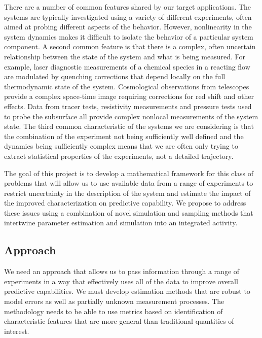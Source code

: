 \documentclass[11pt]{article}
\begin{document}
There are a number of common features shared by our target applications.
The systems are typically investigated using a variety of different experiments, often
aimed at probing different aspects of the behavior.
However, nonlinearity in the system dynamics makes it difficult to isolate the behavior of
a particular system component.
A second common feature is that there is a complex, often uncertain relationship between the state of the system and
what is being measured. For example, laser diagnostic measurements
of a chemical species in a reacting flow are modulated by quenching corrections that depend locally on the full
thermodynamic state of the system. Cosmological observations from telescopes provide a complex
space-time image  requiring corrections for
red shift and other effects. Data from tracer tests, resistivity measurements and pressure tests used to probe the subsurface
all provide complex nonlocal measurements of the system state. 
The third common characteristic of the systems we are considering is that the combination of the experiment not being sufficiently well defined 
and the dynamics being sufficiently complex means that we are often only trying to extract
statistical properties of the experiments, not a detailed trajectory.

The goal of this project is to develop a
mathematical framework for this class of problems that will allow us to use available data from a range
of experiments to restrict
uncertainty in the description of the system and estimate the impact of the improved characterization
on predictive capability.
We propose to address these issues using a combination of novel simulation and sampling methods that
intertwine parameter estimation and simulation into an integrated activity.

\subsection*{Approach}
We need an approach that allows us to pass
information through a range of experiments in a way that effectively uses all of the data
to improve overall predictive capabilities.
We must develop estimation methods that are robust to model errors as well as partially unknown measurement processes.
The methodology needs to be able to use metrics based on identification of
characteristic features that are more general than
traditional quantities of interest.
\end{document}

